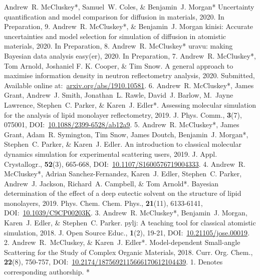 \begin{cvpubys}
  \cvpuby
    {Andrew~R. McCluskey*, Samuel~W. Coles, \& Benjamin~J. Morgan*}
    {Uncertainty quantification and model comparison for diffusion in materials,}
    {2020.}
    {In Preparation,}
    {}
    {}
    {9.}
  \cvpuby
    {Andrew~R. McCluskey*, \& Benjamin~J. Morgan}
    {kinisi: Accurate uncertainties and model selection for simulation of diffusion in atomistic materials,}
    {2020.}
    {In Preparation,}
    {}
    {}
    {8.}
  \cvpuby
    {Andrew~R. McCluskey*}
    {uravu: making Bayesian data analysis easy(er),}
    {2020.}
    {In Preparation,}
    {}
    {}
    {7.}
  \cvpuby
    {\vspace{-0.4cm}Andrew~R. McCluskey*, Tom Arnold, Joshaniel F. K. Cooper, \& Tim Snow.}
    {A general approach to maximise information density in neutron reflectometry analysis,}
    {2020.}
    {Submitted,}
    {}
    {Available online at:~\href{https://arxiv.org/abs/1910.10581}{arxiv.org/abs/1910.10581}.}
    {\vspace{-0.4cm}6.}
  \cvpuby
    {Andrew~R. McCluskey*, James Grant, Andrew~J. Smith, Jonathan~L. Rawle, David~J. Barlow, M.~Jayne Lawrence, Stephen~C. Parker, \& Karen~J. Edler*.}
    {Assessing molecular simulation for the analysis of lipid monolayer reflectometry,}
    {2019.}
    {J. Phys. Comm.,}
    {\textbf{3}(7), 075001,}
    {DOI:~\href{https://doi.org/10.1088/2399-6528/ab12a9}{10.1088/2399-6528/ab12a9}.}
    {5.}
  \cvpuby
    {Andrew~R. McCluskey*, James Grant, Adam~R. Symington, Tim Snow, James Doutch, Benjamin~J. Morgan*, Stephen~C. Parker, \& Karen~J. Edler.}
    {An introduction to classical molecular dynamics simulation for experimental scattering users,}
    {2019.}
    {J. Appl. Crystallogr.,}
    {\textbf{52}(3), 665-668,}
    {DOI:~\href{https://doi.org/10.1107/S1600576719004333}{10.1107/S1600576719004333}.}
    {4.}
  \cvpuby
    {Andrew~R. McCluskey*, Adrian Sanchez-Fernandez, Karen~J. Edler, Stephen~C. Parker, Andrew~J. Jackson, Richard~A. Campbell, \& Tom Arnold*.}
    {Bayesian determination of the effect of a deep eutectic solvent on the structure of lipid monolayers,}
    {2019.}
    {Phys. Chem. Chem. Phys.,}
    {\textbf{21}(11), 6133-6141,}
    {DOI:~\href{https://doi.org/10.1039/C9CP00203K}{10.1039/C9CP00203K}.}
    {3.}
  \cvpuby
    {Andrew~R. McCluskey*, Benjamin~J. Morgan, Karen~J. Edler, \& Stephen~C. Parker.}
    {pylj: A teaching tool for classical atomistic simulation,}
    {2018.}
    {J. Open Source Educ.,}
    {\textbf{1}(2), 19-21,}
    {DOI:~\href{http://doi.org/10.21105/jose.00019}{10.21105/jose.00019}.}
    {2.}
  \cvpuby
    {Andrew~R.~McCluskey, \& Karen~J. Edler*.}
    {Model-dependent Small-angle Scattering for the Study of Complex Organic Materials,}
    {2018.}
    {Curr. Org. Chem.,}
    {\textbf{22}(8), 750-757,}
    {DOI:~\href{http://doi.org/10.2174/1875692115666170612104439}{10.2174/1875692115666170612104439}.}
    {1.}
  \cvpuby
    {Denotes corresponding authorship.}
    {}
    {}
    {}
    {}
    {}
    {*}
\end{cvpubys}
